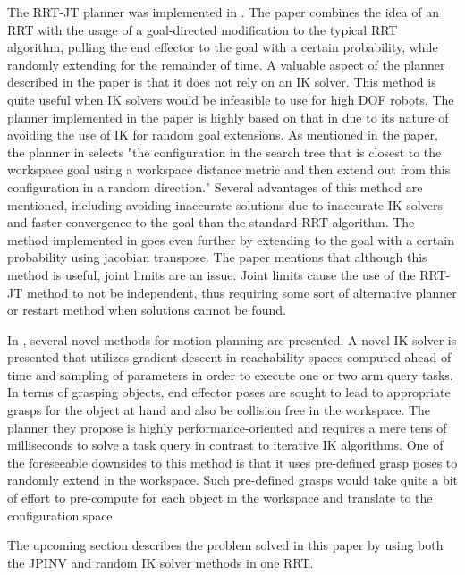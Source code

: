 \documentclass[conference]{IEEEtran} \usepackage[T1]{fontenc} \usepackage[backend=biber, style=ieee]{biblatex}
\begin{document}
The RRT-JT planner was implemented in \cite{random_planner_wo_ik}. The paper combines the idea of an RRT with the usage of a goal-directed modification to 
the typical RRT algorithm, pulling the end effector to the goal with a certain probability, while randomly extending for the remainder of time. A valuable 
aspect of the planner described in the paper is that it does not rely on an IK solver. This method is quite useful when IK solvers would be infeasible to use
for high DOF robots. The planner implemented in the paper is highly based on that in \cite{integrated_path_planning} due to its nature of avoiding the use of
IK for random goal extensions. As mentioned in the paper, the planner in \cite{integrated_path_planning} selects "the configuration in the search tree that 
is closest to the workspace goal using a workspace distance metric and then extend out from this configuration in a random direction." Several advantages
of this method are mentioned, including avoiding inaccurate solutions due to inaccurate IK solvers and faster convergence to the goal than the standard RRT
algorithm. The method implemented in \cite{random_planner_wo_ik} goes even further by extending to the goal with a certain probability using jacobian
transpose. The paper mentions that although this method is useful, joint limits are an issue. Joint limits cause the use of the RRT-JT method to not be
independent, thus requiring some sort of alternative planner or restart method when solutions cannot be found.

In \cite{humanoid_motion_planning}, several novel methods for motion planning are presented. A novel IK solver is presented that utilizes gradient descent
in reachability spaces computed ahead of time and sampling of parameters in order to execute one or two arm query tasks. In terms of grasping objects,
end effector poses are sought to lead to appropriate grasps for the object at hand and also be collision free in the workspace. The planner they propose
is highly performance-oriented and requires a mere tens of milliseconds to solve a task query in contrast to iterative IK algorithms. One of the foreseeable downsides
to this method is that it uses pre-defined grasp poses to randomly extend in the workspace. Such pre-defined grasps would take quite a bit of effort to pre-compute
for each object in the workspace and translate to the configuration space.

The upcoming section describes the problem solved in this paper by using both the JPINV and random IK solver methods in one RRT.
\end{document}
